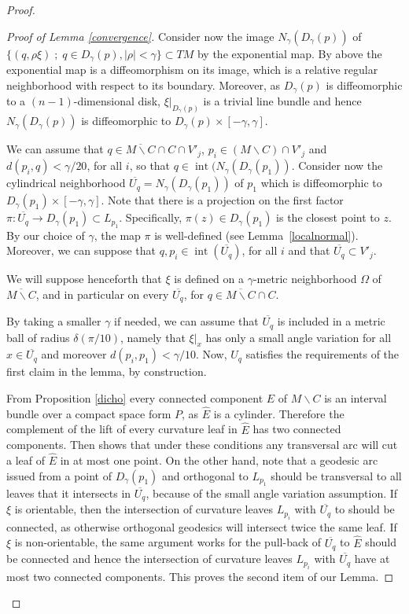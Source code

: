 \documentclass[JEP,XML,SOM,Unicode]{cedram}
\let\moins\smallsetminus
\DeclareMathOperator{\inte}{int}
\newcommand{\sep}{\;;\;}
\theoremstyle{definition}
\theoremstyle{remark}
\numberwithin{equation}{section}
\begin{document}
\begin{proof}
\begin{proof}[Proof of Lemma \ref{convergence}]
Consider now the image $N_{\gamma}(D_{\gamma}(p))$ of
$\{(q, \rho\xi)\sep q\in D_{\gamma}(p), |\rho| < \gamma\}\subset TM$ by the exponential map.
By above the exponential map is a diffeomorphism on its image, which is a
relative regular neighborhood with respect to its boundary.
Moreover, as $D_{\gamma}(p)$ is diffeomorphic to a $(n-1)$-dimensional disk,
$\xi|_{D_{\gamma}(p)}$ is a trivial line bundle and hence $N_{\gamma}(D_{\gamma}(p))$ is diffeomorphic to
$D_{\gamma}(p)\times [-\gamma, \gamma]$.

We can assume that $q\in \overline{M\moins C}\cap C\cap V'_j$, $p_i\in (M\moins C)\cap V'_j$ and
$d(p_i,q) < \gamma/20$, for all $i$, so that $q\in \inte (N_{\gamma}(D_{\gamma}(p_1))$.
Consider now the cylindrical neighborhood $\overline{U_q}= N_{\gamma}(D_{\gamma}(p_1))$ of $p_1$ which is diffeomorphic to
$D_{\gamma}(p_1)\times [-\gamma, \gamma]$.
Note that there is a projection on the first factor $\pi: \overline{U_q}\to D_{\gamma}(p_1)\subset L_{p_1}$. Specifically,
$\pi(z)\in D_{\gamma}(p_1)$ is the closest point to $z$. By our choice of $\gamma$, the map $\pi$ is well-defined (see Lemma~\ref{localnormal}).
Moreover, we can suppose that $q, p_i\in \inte (\overline{U_q})$, for all $i$ and that $\overline{U_q}\subset V'_j$.

We will suppose henceforth that $\xi$ is defined on a $\gamma$-metric neighborhood $\Omega$ of $\overline{M\moins C}$, and in
particular on every $\overline{U_q}$, for $q\in \overline{M\moins C}\cap C$.

By taking a smaller $\gamma$ if needed, we can assume that
$\overline{U_q}$ is included in a metric ball of radius $\delta(\pi/10)$, namely that
$\xi|_x$ has only a small angle variation for all $x\in \overline{U_q}$ and moreover
$d(p_i,p_1)<\gamma/10$. Now, $U_q$ satisfies the requirements of the first claim in the lemma, by construction.

From Proposition \ref{dicho} every connected component $E$ of $M\moins C$ is an interval bundle over a compact space form $P$, as $\widehat{E}$ is a cylinder.
Therefore the complement of the lift of every curvature leaf in $\widehat{E}$ has two connected components.
Then \cite[Lem.\,2, p.\,385]{Hae} shows that under these conditions any transversal arc will cut a leaf of $\widehat{E}$ in at most one point.
On the other hand, note that a geodesic arc issued from a point of $D_{\gamma}(p_1)$ and orthogonal to $L_{p_1}$ should be
transversal to all leaves that it intersects in $\overline{U_q}$, because of the small angle variation assumption.
If $\xi$ is orientable, then the intersection of curvature leaves $L_{p_i}$ with $\overline{U_q}$ to should be connected,
as otherwise orthogonal geodesics will intersect twice the same leaf. If $\xi$ is non-orientable, the same argument works for the pull-back
of $\overline{U_q}$ to $\widehat{E}$ should be connected and hence the intersection of curvature leaves $L_{p_i}$ with $\overline{U_q}$
have at most two connected components. This proves the second item of our Lemma.


\end{proof}
\end{proof}
\end{document}
